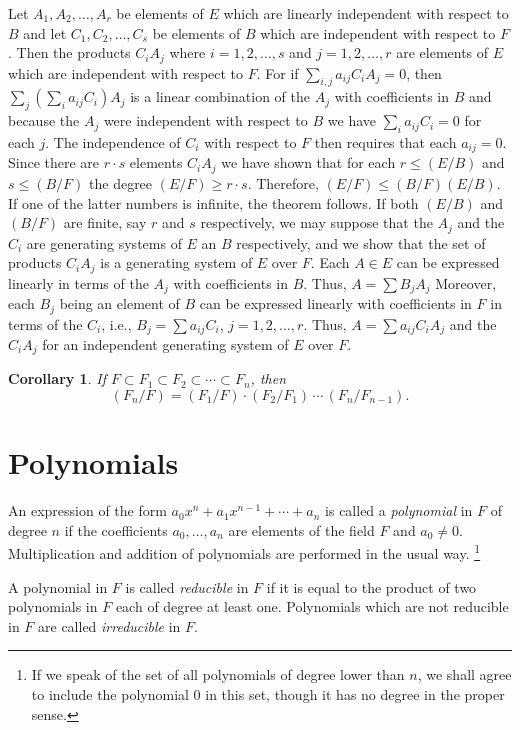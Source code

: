 \documentclass[10pt,leqno,a5paper]{book}
\newtheorem*{coro*}{Corollary}
\theoremstyle{definition}
\let\htw\section
\begin{document}
Let $A_1, A_2, \ldots, A_r$ be elements of $E$ which are linearly independent with respect to $B$ and let $C_1, C_2, \ldots, C_s$ be elements of $B$ which are independent with respect to $F$.
Then the products $C_i A_j$ where $i = 1,2,\ldots, s$ and $j=1,2,\ldots,r$ are elements of $E$ which are independent with respect to $F$.
For if $\sum_{i,j} a_{ij} C_i A_j = 0$, then
$\sum_j (\sum_i a_{ij} C_i) A_j$ is a linear combination of the $A_j$ with coefficients in $B$ and because the $A_j$ were independent with respect to $B$ we have $\sum_i a_{ij} C_i = 0$ for each $j$.
The independence of $C_i$ with respect to $F$ then requires that each $a_{ij} = 0$.
Since there are $r \cdot s$ elements $C_i A_j$ we have shown that for each $r \leq (E/B)$ and $s \leq (B/F)$ the degree $(E/F) \geq r \cdot s$.
Therefore, $(E/F) \leq (B/F) (E/B)$.
If one of the latter numbers is infinite, the theorem follows.
If both $(E/B)$ and $(B/F)$ are finite, say $r$ and $s$ respectively, we may suppose that the $A_j$ and the $C_i$ are generating systems of $E$ an $B$ respectively, and we show that the set of products $C_i A_j$ is a generating system of $E$ over $F$.
Each $A \in E$ can be expressed linearly in terms of the $A_j$ with coefficients in $B$.
Thus, $A = \sum B_j A_j$
Moreover, each $B_j$ being an element of $B$ can be expressed linearly with coefficients in $F$ in terms of the $C_i$, i.e., $B_j = \sum a_{ij} C_i$, $j=1,2,\ldots,r$.
Thus, $A = \sum a_{ij} C_i A_j$ and the $C_iA_j$ for an independent generating system of $E$ over $F$.


\begin{coro*}
\label{coro:p22}
If $F \subset F_1 \subset F_2 \subset \cdots \subset F_n$, then
\[
(F_n/F) = (F_1/F) \cdot (F_2/F_1) \, \cdots \, (F_n/F_{n-1}).
\]
\end{coro*}


\htw{Polynomials}

An expression of the form $a_0 x^n + a_1 x^{n-1} + \cdots + a_n$ is called a \emph{polynomial} in $F$ of degree $n$ if the coefficients $a_0, \ldots, a_n$ are elements of the field $F$ and $a_0 \not= 0$.
Multiplication and addition of polynomials are performed in the usual way.%
\footnote{If we speak of the set of all polynomials of degree lower than $n$, we shall agree to include the polynomial $0$ in this set, though it has no degree in the proper sense.}

A polynomial in $F$ is called \emph{reducible} in $F$ if it is equal to the product of two polynomials in $F$ each of degree at least one.
Polynomials which are not reducible in $F$ are called \emph{irreducible} in $F$.
\end{document}
